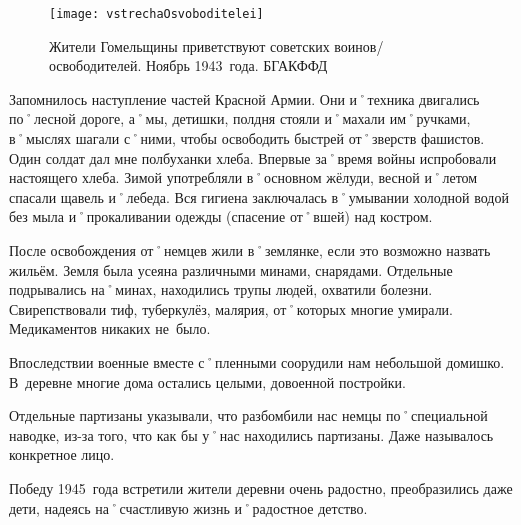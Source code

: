\begin{wrapfigure}{O}{.4\textwidth}
\centering
\texttt{[image: vstrechaOsvoboditelei]}
\caption{Жители Гомельщины приветствуют советских воинов\-/освободителей. Ноябрь 1943~года. БГАКФФД}
\label{fig:vstrechaOsvoboditelei}
\end{wrapfigure}

Запомнилось наступление частей Красной Армии. Они и˚техника двигались по˚лесной дороге, а˚мы, детишки, полдня стояли и˚махали им˚ручками, в˚мыслях шагали с˚ними, чтобы освободить быстрей от˚зверств фашистов. Один солдат дал мне полбуханки хлеба. Впервые за˚время войны испробовали настоящего хлеба. Зимой употребляли в˚основном жёлуди, весной и˚летом спасали щавель и˚лебеда. Вся гигиена заключалась в˚умывании холодной водой без мыла и˚прокаливании одежды (спасение от˚вшей) над костром.

После освобождения от˚немцев жили в˚землянке, если это возможно назвать жильём. Земля была усеяна различными минами, снарядами. Отдельные подрывались на˚минах, находились трупы людей, охватили болезни. Свирепствовали тиф, туберкулёз, малярия, от˚которых многие умирали. Медикаментов никаких не~было. 

Впоследствии военные вместе с˚пленными соорудили нам небольшой домишко. В~деревне многие дома остались целыми, довоенной постройки. 

Отдельные партизаны указывали, что разбомбили нас немцы по˚специальной наводке, из-за того, что как бы у˚нас находились партизаны. Даже называлось конкретное лицо. 

Победу 1945~года встретили жители деревни очень радостно, преобразились даже дети, надеясь на˚счастливую жизнь и˚радостное детство.